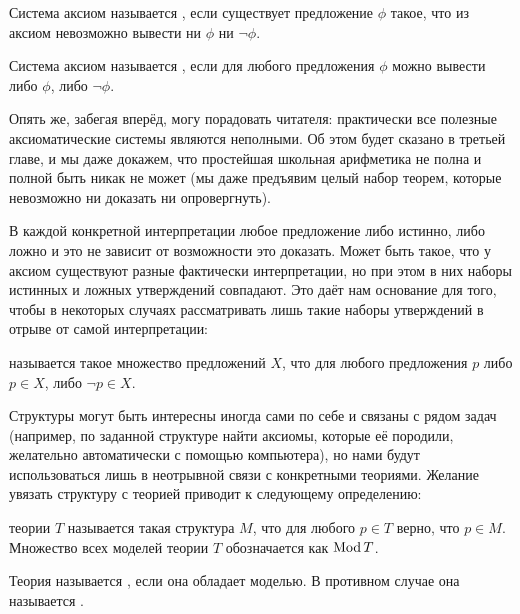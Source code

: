 \begin{definition}
Система аксиом называется , если существует предложение $\phi$ такое, что из аксиом невозможно вывести ни $\phi$ ни $\neg\phi$.
\end{definition}

\begin{definition}
Система аксиом называется , если для любого предложения $\phi$ можно вывести либо $\phi$, либо $\neg\phi$.
\end{definition}

Опять же, забегая вперёд, могу порадовать читателя: практически все полезные аксиоматические системы являются неполными. Об этом будет сказано в третьей главе, и мы даже докажем, что простейшая школьная арифметика не полна и полной быть никак не может (мы даже предъявим целый набор теорем, которые невозможно ни доказать ни опровергнуть).

В каждой конкретной интерпретации любое предложение либо истинно, либо ложно и это не зависит от возможности это доказать. Может быть такое, что у аксиом существуют разные фактически интерпретации, но при этом в них наборы истинных и ложных утверждений совпадают. Это даёт нам основание для того, чтобы в некоторых случаях рассматривать лишь такие наборы утверждений в отрыве от самой интерпретации:

\begin{definition}
 называется такое множество предложений $X$, что для любого предложения $p$ либо $p\in X$, либо $\neg p \in X$.
\end{definition}

Структуры могут быть интересны иногда сами по себе и связаны с рядом задач (например, по заданной структуре найти аксиомы, которые её породили, желательно автоматически с помощью компьютера), но нами будут использоваться лишь в неотрывной связи с конкретными теориями. Желание увязать структуру с теорией приводит к следующему определению:

\begin{definition}
 теории $T$ называется такая структура $M$, что для любого $p\in T$ верно, что $p\in M$. Множество всех моделей теории $T$ обозначается как $\operatorname{Mod} T$.
\end{definition}

\begin{definition}
Теория называется , если она обладает моделью. В противном случае она называется .
\end{definition}

